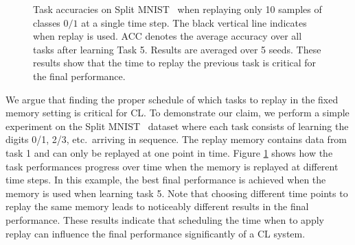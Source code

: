 \begin{figure}[t]
\centering
\setlength{\figwidth}{.25\textwidth}
\setlength{\figheight}{.15\textheight}

\vspace{-3mm}
\caption{Task accuracies on Split MNIST~\cite{C:zenke2017continual} when replaying only 10 samples of classes $0/1$ at a single time step. The black vertical line indicates when replay is used. ACC denotes the average accuracy over all tasks after learning Task 5. Results are averaged over 5 seeds. These results show that the time to replay the previous task is critical for the final performance.}
\label{fig:single_task_replay_with_M10}
\vspace{-1em}
\end{figure}

We 
argue that finding the proper schedule of which tasks to replay in the fixed memory setting is critical for CL. To demonstrate our claim, we perform a simple experiment on the Split MNIST~ dataset where each task consists of learning the digits 0/1, 2/3, etc.\ arriving in sequence.
The replay memory contains data from task 1 and can only be replayed at one point in time.
Figure \ref{fig:single_task_replay_with_M10} shows how the task performances progress over time when the memory is replayed at different time steps. In this example, the best final performance is achieved when the memory is used when learning task 5.
Note that choosing different time points to replay the same memory leads to noticeably different results in the final performance. 
These results indicate that scheduling the time when to apply replay can influence the final performance significantly of a CL system.  


